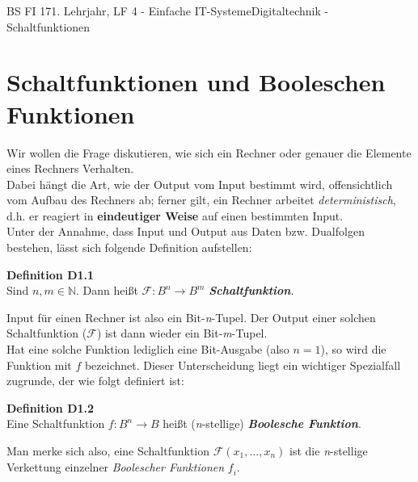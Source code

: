 \documentclass[11pt,twocolumn,oneside,openany,headings=optiontotoc,11pt,numbers=noenddot]{article}
\begin{document}
	\begin{worksheet}{BS FI 17}{1. Lehrjahr, LF 4 - Einfache IT-Systeme}{Digitaltechnik - Schaltfunktionen}
		\section{Schaltfunktionen und Booleschen Funktionen}
		Wir wollen die Frage diskutieren, wie sich ein Rechner oder genauer die Elemente eines Rechners Verhalten.\\
		Dabei hängt die Art, wie der Output vom Input bestimmt wird, offensichtlich vom Aufbau des Rechners ab; ferner gilt, ein Rechner arbeitet \textit{deterministisch}, d.h. er reagiert in \textbf{eindeutiger Weise} auf einen bestimmten Input.\\
		Unter der Annahme, dass Input und  Output aus Daten bzw. Dualfolgen bestehen, lässt sich folgende Definition aufstellen:
		\begin{framed}
			\textbf{Definition D1.1}\\Sind \(n,m \in \mathbb{N}\). Dann heißt
			\(\mathcal{F}: B^n \rightarrow B^m\) \textit{\textbf{Schaltfunktion}}.
		\end{framed}
		\noindent
		Input für einen Rechner ist also ein Bit-\textit{n}-Tupel. Der Output einer solchen Schaltfunktion (\(\mathcal{F}\)) ist dann wieder ein Bit-\textit{m}-Tupel.\\
		Hat eine solche Funktion lediglich eine Bit-Ausgabe (also \(n = 1\)), so wird die Funktion mit \(\mathit{f}\) bezeichnet. Dieser Unterscheidung liegt ein wichtiger Spezialfall zugrunde, der wie folgt definiert ist:
		\begin{framed}
			\textbf{Definition D1.2}\\Eine Schaltfunktion \(\mathit{f}: B^n \rightarrow B\)
			heißt (\textit{n}-stellige) \textit{\textbf{Boolesche Funktion}}.
		\end{framed}
		Man merke sich also, eine Schaltfunktion \(\mathcal{F}(x_1,...,x_n)\) ist die \textit{n}-stellige Verkettung einzelner \textit{Boolescher Funktionen} \(\mathit{f}_i\).

\end{worksheet}
\end{document}
